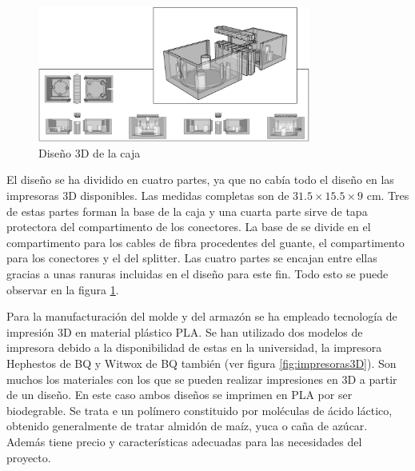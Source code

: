 \begin{itemize}
  	\begin{figure}[H]
		\centering
		\includegraphics[width=0.8\textwidth]{./img/caja}
		\caption{Diseño 3D de la caja} \label{fig:caja}
	\end{figure}
 	
 	El diseño se ha dividido en cuatro partes, ya que no cabía todo el diseño en las impresoras 3D disponibles. Las medidas completas son de $31.5\times15.5\times9$ cm. Tres de estas partes forman la base de la caja y una cuarta parte sirve de tapa protectora del compartimento de los conectores. La base de se divide en el compartimento para los cables de fibra procedentes del guante, el compartimento para los conectores  y el del splitter. Las cuatro partes se encajan entre ellas gracias a unas ranuras incluidas en el diseño para este fin. Todo esto se puede observar en la figura \ref{fig:caja}.
 

 	Para la manufacturación del molde y del armazón se ha empleado tecnología de impresión 3D en material plástico PLA. Se han utilizado dos modelos de impresora debido a la disponibilidad de estas en la universidad, la impresora Hephestos de BQ y Witwox de BQ también (ver figura \ref{fig:impresoras3D}). Son muchos los materiales con los que se pueden realizar impresiones en 3D a partir de un diseño. En este caso ambos diseños se imprimen en PLA por ser biodegrable. Se trata e un polímero constituido por moléculas de ácido láctico, obtenido generalmente de tratar almidón de maíz, yuca o caña de azúcar. Además tiene precio y características adecuadas para las necesidades del proyecto. \cite{bioPLA}
 	

\end{itemize}
